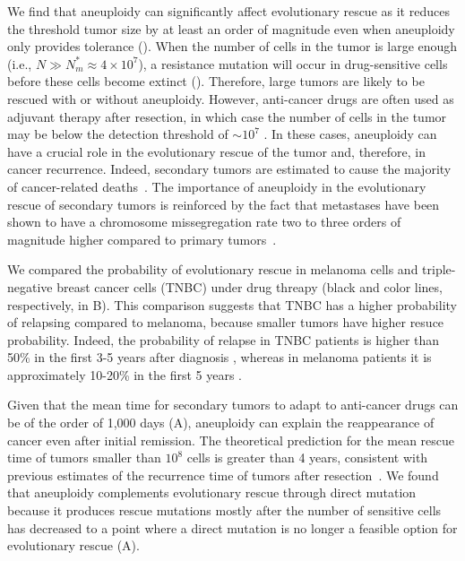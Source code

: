 \documentclass[12pt]{extarticle}
\begin{document}
We find that aneuploidy can significantly affect evolutionary rescue as it reduces the threshold tumor size by at least an order of magnitude even when aneuploidy only provides tolerance ().
When the number of cells in the tumor is large enough (i.e., $N \gg N_m^* \approx 4\times10^7$), a resistance mutation will occur in drug-sensitive cells before these cells become extinct (). Therefore, large tumors are likely to be rescued with or without aneuploidy.
However, anti-cancer drugs are often used as adjuvant therapy after resection, in which case the number of cells in the tumor may be below the detection threshold of $\sim10^7$  \citep{bozic2013evolutionary}. In these cases, aneuploidy can have a crucial role in the evolutionary rescue of the tumor and, therefore, in cancer recurrence. Indeed, secondary tumors are estimated to cause the majority of cancer-related deaths~\citep{chaffer2011perspective}. The importance of aneuploidy in the evolutionary rescue of secondary tumors is reinforced by the fact that metastases have been shown to have a chromosome missegregation rate two to three orders of magnitude higher compared to primary tumors~\citep{kimmel2023intra}.

We compared the probability of evolutionary rescue in melanoma cells and triple-negative breast cancer cells (TNBC) under drug threapy (black and color lines, respectively, in B).
This comparison suggests that TNBC has a higher probability of relapsing compared to melanoma, because smaller tumors have higher resuce probability. Indeed, the probability of relapse in TNBC patients is higher than 50\% in the first 3-5 years after diagnosis \citep{taushanova2023synchronous}, whereas in melanoma patients it is approximately 10-20\% in the first 5 years \citep{wan2022prediction,von_schuckmann2019risk}. %

Given that the mean time for secondary tumors to adapt to anti-cancer drugs can be of the order of 1,000 days (A), aneuploidy can explain the reappearance of cancer even after initial remission. The theoretical prediction for the mean rescue time of tumors smaller than $10^8$ cells is greater than 4 years, consistent with previous estimates of the recurrence time of tumors after resection~\citep{avanzini2019cancer}. We found that aneuploidy complements evolutionary rescue through direct mutation because it produces rescue mutations mostly after the number of sensitive cells has decreased to a point where a direct mutation is no longer a feasible option for evolutionary rescue (A).
\end{document}
